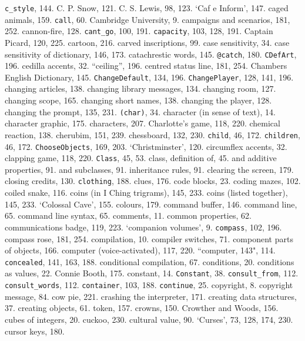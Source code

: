 {{\tt c\_style}}, 144.
C. P. Snow, 121.
C. S. Lewis, 98, 123.
`Caf{ e} Inform', 147.
caged animals, 159.
{{\tt call}}, 60.
Cambridge University, 9.
campaigns and scenarios, 181, 252.
cannon-fire, 128.
{{\tt cant\_go}}, 100, 191.
{{\tt capacity}}, 103, 128, 191.
Captain Picard, 120, 225.
cartoon, 216.
carved inscriptions, 99.
case sensitivity, 34.
case sensitivity of dictionary, 146, 173.
catachrestic words, 145.
{{\tt @catch}}, 180.
{{\tt CDefArt}}, 196.
cedilla accents, 32.
``ceiling'', 196.
centred status line, 181, 254.
Chambers English Dictionary, 145.
{{\tt ChangeDefault}}, 134, 196.
{{\tt ChangePlayer}}, 128, 141, 196.
changing articles, 138.
changing library messages, 134.
changing room, 127.
changing scope, 165.
changing short names, 138.
changing the player, 128.
changing the prompt, 135, 231.
{{\tt (char)}}, 34.
character (in sense of text), 14.
character graphic, 175.
characters, 207.
Charlotte's game, 118, 220.
chemical reaction, 138.
cherubim, 151, 239.
chessboard, 132, 230.
{{\tt child}}, 46, 172.
{{\tt children}}, 46, 172.
{{\tt ChooseObjects}}, 169, 203.
`Christminster', 120.
circumflex accents, 32.
clapping game, 118, 220.
{{\tt Class}}, 45, 53.
class, definition of, 45.
\quad  and additive properties, 91.
\quad  and subclasses, 91.
\quad  inheritance rules, 91.
clearing the screen, 179.
closing credits, 130.
{{\tt clothing}}, 188.
clues, 176.
code blocks, 23.
coding mazes, 102.
coiled snake, 116.
coins (in I Ching trigrams), 145, 233.
coins (listed together), 145, 233.
`Colossal Cave', 155.
colours, 179.
command buffer, 146.
command line, 65.
command line syntax, 65.
comments, 11.
common properties, 62.
communications badge, 119, 223.
`companion volumes', 9.
{{\tt compass}}, 102, 196.
compass rose, 181, 254.
compilation, 10.
compiler switches, 71.
component parts of objects, 166.
computer (voice-activated), 117, 220.
``computer, 143", 114.
{{\tt concealed}}, 141, 163, 188.
conditional compilation, 67.
conditions, 20.
conditions as values, 22.
Connie Booth, 175.
constant, 14.
{{\tt Constant}}, 38.
{{\tt consult\_from}}, 112.
{{\tt consult\_words}}, 112.
{{\tt container}}, 103, 188.
{{\tt continue}}, 25.
copyright, 8.
copyright message, 84.
cow pie, 221.
crashing the interpreter, 171.
creating data structures, 37.
creating objects, 61.
 token, 157.
crowns, 150.
Crowther and Woods, 156.
cubes of integers, 20.
cuckoo, 230.
cultural value, 90.
`Curses', 73, 128, 174, 230.
cursor keys, 180.

